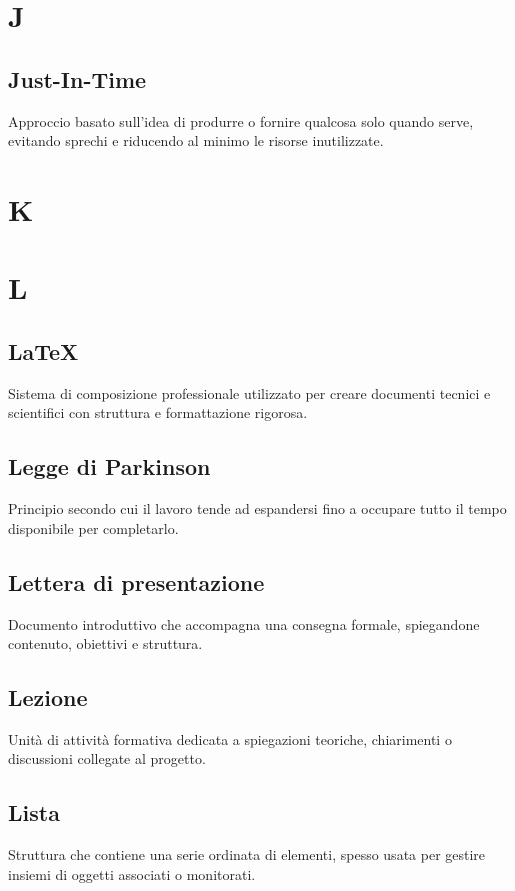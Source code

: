 \documentclass[a4paper,12pt]{article}
\begin{document}
\newpage
        \section{J}
        
          \subsection*{Just-In-Time}
			Approccio basato sull'idea di produrre o fornire qualcosa solo quando serve, evitando sprechi e riducendo al minimo le risorse inutilizzate.
        
\newpage
        \section{K}
        
\newpage 
        \section{L}
        
          \subsection*{LaTeX}
			Sistema di composizione professionale utilizzato per creare documenti tecnici e scientifici con struttura e formattazione rigorosa.
          \subsection*{Legge di Parkinson}
			Principio secondo cui il lavoro tende ad espandersi fino a occupare tutto il tempo disponibile per completarlo.
          \subsection*{Lettera di presentazione}
			Documento introduttivo che accompagna una consegna formale, spiegandone contenuto, obiettivi e struttura.
          \subsection*{Lezione}
			Unità di attività formativa dedicata a spiegazioni teoriche, chiarimenti o discussioni collegate al progetto.
          \subsection*{Lista}
			Struttura che contiene una serie ordinata di elementi, spesso usata per gestire insiemi di oggetti associati o monitorati.
\end{document}
